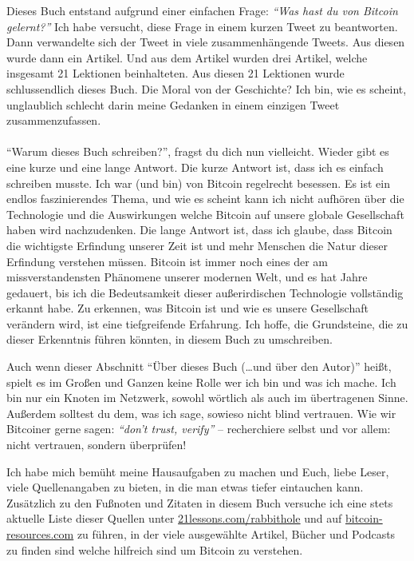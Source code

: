Dieses Buch entstand aufgrund einer einfachen Frage: \textit{\enquote{Was hast
du von Bitcoin gelernt?}} Ich habe versucht, diese Frage in einem kurzen Tweet
zu beantworten. Dann verwandelte sich der Tweet in viele zusammenhängende
Tweets. Aus diesen wurde dann ein Artikel. Und aus dem Artikel wurden drei
Artikel, welche insgesamt 21 Lektionen beinhalteten. Aus diesen 21 Lektionen
wurde schlussendlich dieses Buch. Die Moral von der Geschichte? Ich bin, wie es
scheint,  unglaublich schlecht darin meine Gedanken in einem einzigen Tweet
zusammenzufassen.

\paragraph{}
\enquote{Warum dieses Buch schreiben?}, fragst du dich nun vielleicht. Wieder
gibt es eine kurze und eine lange Antwort. Die kurze Antwort ist, dass ich es
einfach schreiben musste. Ich war (und bin) von Bitcoin regelrecht besessen. Es
ist ein endlos faszinierendes Thema, und wie es scheint kann ich nicht aufhören
über die Technologie und die Auswirkungen welche Bitcoin auf unsere globale
Gesellschaft haben wird nachzudenken. Die lange Antwort ist, dass ich glaube,
dass Bitcoin die wichtigste Erfindung unserer Zeit ist und mehr Menschen die
Natur dieser Erfindung verstehen müssen. Bitcoin ist immer noch eines der am
missverstandensten Phänomene unserer modernen Welt, und es hat Jahre
gedauert, bis ich die Bedeutsamkeit dieser außerirdischen Technologie vollständig
erkannt habe. Zu erkennen, was Bitcoin ist und wie es unsere Gesellschaft
verändern wird, ist eine tiefgreifende Erfahrung. Ich hoffe, die Grundsteine, die zu
dieser Erkenntnis führen könnten, in diesem Buch zu umschreiben.

Auch wenn dieser Abschnitt \enquote{Über dieses Buch (\ldots und über den
Autor)} heißt, spielt es im Großen und Ganzen keine Rolle wer ich bin und was
ich mache. Ich bin nur ein Knoten im Netzwerk, sowohl wörtlich als auch im
übertragenen Sinne. Außerdem solltest du dem, was ich sage, sowieso nicht blind
vertrauen. Wie wir Bitcoiner gerne sagen: \textit{\enquote{don't trust, verify}}
-- recherchiere selbst und vor allem: nicht vertrauen, sondern überprüfen!

Ich habe mich bemüht meine Hausaufgaben zu machen und Euch, liebe Leser, viele
Quellenangaben zu bieten, in die man etwas tiefer eintauchen kann. Zusätzlich zu
den Fußnoten und Zitaten in diesem Buch versuche ich eine stets aktuelle Liste
dieser Quellen unter
\href{https://21lessons.com/rabbithole}{21lessons.com/rabbithole} und auf
\href{https://bitcoin-resources.com}{bitcoin-resources.com} zu führen, in der
viele ausgewählte Artikel, Bücher und Podcasts zu finden sind welche hilfreich
sind um Bitcoin zu verstehen.

